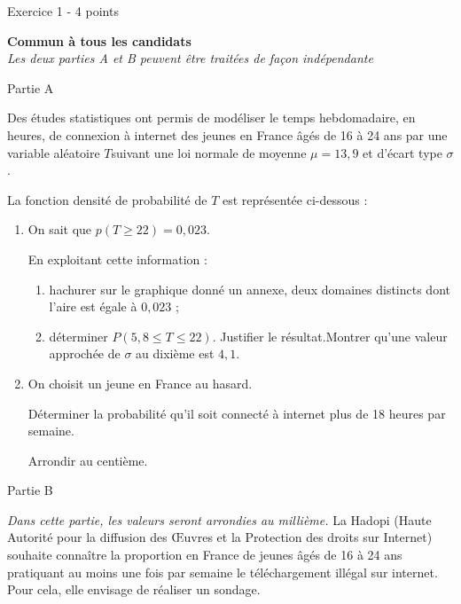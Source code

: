
%
\begin{h2}Exercice 1 -  4 points\end{h2}

\textbf{Commun  à tous les candidats}
\\
\textit{Les deux parties A et B peuvent être traitées de façon indépendante}
\begin{h3}Partie A\end{h3}
Des études statistiques ont permis de modéliser le temps hebdomadaire, en heures, de connexion à internet des jeunes en France âgés de 16 à 24 ans par une variable aléatoire $T$suivant une loi normale de moyenne $\mu = 13,9$ et d'écart type $\sigma$.
\par
La fonction densité de probabilité de $T$ est représentée ci-dessous :
\begin{center}
\end{center}
\begin{enumerate}
     \item
     On sait que $p(T \geqslant 22) =  0,023$.
     \par
     En exploitant cette information :
     \begin{enumerate}[label=\alph*.]
          \item
          hachurer sur le graphique donné un annexe, deux domaines distincts dont l'aire est égale à $0,023$ ;
          \item
          déterminer $P(5,8 \leqslant T \leqslant 22)$. Justifier le résultat.Montrer qu'une valeur approchée de $\sigma$ au dixième est $4,1$.
     \end{enumerate}
     \item
     On choisit un jeune en France au hasard.
     \par
     Déterminer la probabilité qu'il soit connecté à internet plus de 18 heures par semaine.
     \par
     Arrondir au centième.
\end{enumerate}
\begin{h3}Partie B\end{h3}
\textit{Dans cette partie, les valeurs seront arrondies au millième.}
La Hadopi (Haute Autorité pour la diffusion des Œuvres et la Protection des droits sur Internet) souhaite connaître la proportion en France de jeunes âgés de 16 à 24 ans pratiquant au moins une fois par semaine le téléchargement illégal sur internet. Pour cela, elle envisage de réaliser un sondage.
